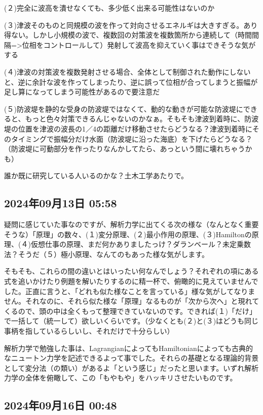 \documentclass[facebook_diary.tex]{subfiles}
\begin{document}
(２)完全に波高を潰せなくても、多少低く出来る可能性はないのか

(３)津波そのものと同規模の波を作って対向させるエネルギは大きすぎる。あり得ない。しかし小規模の波で、複数回の対策波を複数箇所から連続して（時間間隔=>位相をコントロールして）発射して波高を抑えていく事はできそうな気がする

(４)津波の対策波を複数発射させる場合、全体として制御された動作にしないと、逆に余計な波を作ってしまったり、逆に誤って位相が合ってしまうと振幅が足し算になってしまう可能性があるので要注意だ

(５)防波堤を静的な受身の防波堤ではなくて、動的な動きが可能な防波堤にできると、もっと色々対策できるんじゃないのかなぁ。そもそも津波到着時に、防波堤の位置を津波の波長の1／4の距離だけ移動させたらどうなる？津波到着時にそのタイミングで振幅分だけ水面（防波堤に沿った海底）を下げたらどうなる？（防波堤に可動部分を作ったりなんかしてたら、あっという間に壊れちゃうかも）


誰か既に研究している人いるのかな？土木工学あたりで。

\subsection*{2024年09月13日 05:58}

疑問に感じていた事なのですが、解析力学に出てくる次の様な（なんとなく重要そうな）「原理」の数々、(１)変分原理、(２)最小作用の原理、(３)Hamiltonの原理、(４)仮想仕事の原理、まだ何かありましたっけ？ダランベール？未定乗数法？そうだ（５）極小原理、なんてのもあった様な気がします。


そもそも、これらの間の違いとはいったい何なんでしょう？それぞれの項にある式を追いかけたり例題を解いたりするのに精一杯で、俯瞰的に見えていませんでした。正直に言うと、「どれも似た様なことを言っている」様な気がしてなりません。それなのに、それら似た様な「原理」なるものが「次から次へ」と現れてくるので、頭の中は全くもって整理できていないのです。できれば(１)「だけ」で一括して（統一して）欲しいくらいです。（少なくとも(２)と(３)はどうも同じ事柄を指しているらしいし、それだけで十分らしい）


解析力学で勉強した事は、LagrangianによってもHamiltonianによっても古典的なニュートン力学を記述できるよって事でした。それらの基礎となる理論的背景として変分法（の類い）があるよ「という感じ」だったと思います。いずれ解析力学の全体を俯瞰して、この「もやもや」をハッキリさせたいものです。

\subsection*{2024年09月16日 00:48}
\end{document}
